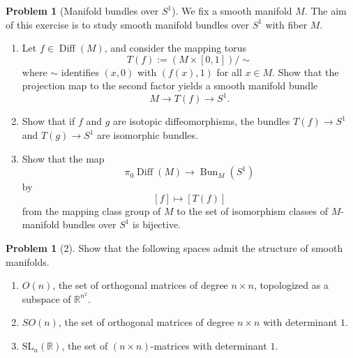 \documentclass[reqno]{amsart}
\theoremstyle{definition}
\newtheorem{problem}[theorem]{Problem}
\theoremstyle{remark}
\DeclareMathOperator{\Bun}{Bun}
\DeclareMathOperator{\Diff}{Diff}
\newcommand{\SL}{{\mathrm{SL}}}
\begin{document}
\begin{problem}[Manifold bundles over $S^{1}$]
    We fix a smooth manifold $M$. The aim of this exercise
    is to study smooth manifold bundles over $S^{1}$ with
    fiber $M$.
    \begin{enumerate}
        \item Let $f \in \Diff (M)$, and consider the
            mapping torus
            \[
            T(f) := \left( M \times \left[ 0,1 \right]  \right) 
            / \sim
            \] 
            where $\sim$ identifies 
            $\left( x,0 \right) $ with
            $\left( f(x),1 \right) $ for all $x \in M$.
            Show that the projection map to the
            second factor yields a 
            smooth manifold bundle
            \[
            M \to T(f) \to S^{1}.
            \] 
        \item Show that if $f$ and $g$ are isotopic diffeomorphisms,
            the bundles $T(f) \to S^{1}$ and
            $T(g) \to S^{1}$ are isomorphic bundles.
        \item Show that the map
            \[
            \pi_0 \Diff(M) \to \Bun_M\left( S^{1} \right)
            \] 
            by
            \[
            \left[ f \right] \mapsto \left[ T(f) \right] 
            \] 
            from the mapping class group of $M$ to the
            set of isomorphism classes of
            $M$-manifold bundles over $S^{1}$ is bijective.
    \end{enumerate}
\end{problem}


\begin{problem}[2]
    Show that the following spaces admit the structure of
    smooth manifolds.
    \begin{enumerate}
        \item $O(n)$, the set of orthogonal matrices
            of degree $n\times  n$, topologized as
            a subspace of $\mathbb{R}^{n^2}$.
        \item $SO(n)$, the set of orthogonal matrices of
            degree $n \times n$ with determinant $1$.
        \item $\SL_n(\mathbb{R})$, the set
            of $\left( n\times n \right) $-matrices with
            determinant $1$.
    \end{enumerate}
\end{problem}
\end{document}
